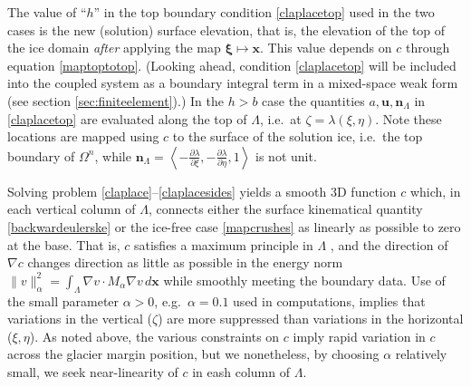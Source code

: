 \documentclass[letterpaper,final,12pt,reqno]{amsart}
\newcommand{\grad}{\nabla}
\newcommand{\bn}{\mathbf{n}}
\newcommand{\bu}{\mathbf{u}}
\newcommand{\bx}{\mathbf{x}}
\newcommand{\bxi}{\bm{\xi}}
\begin{document}
The value of ``$h$'' in the top boundary condition \eqref{claplacetop} used in the two cases is the new (solution) surface elevation, that is, the elevation of the top of the ice domain \emph{after} applying the map $\bxi\mapsto \bx$.  This value depends on $c$ through equation \eqref{maptoptotop}.  (Looking ahead, condition \eqref{claplacetop} will be included into the coupled system as a boundary integral term in a mixed-space weak form (see section \ref{sec:finiteelement}).)  In the $h>b$ case the quantities $a,\bu,\bn_\Lambda$ in \eqref{claplacetop} are evaluated along the top of $\Lambda$, i.e.~at $\zeta=\lambda(\xi,\eta)$.  Note these locations are mapped using $c$ to the surface of the solution ice, i.e.~the top boundary of $\Omega^n$, while $\bn_\Lambda = \left<-\frac{\partial\lambda}{\partial\xi},-\frac{\partial\lambda}{\partial\eta},1\right>$ is not unit.

Solving problem \eqref{claplace}--\eqref{claplacesides} yields a smooth 3D function $c$ which, in each vertical column of $\Lambda$, connects either the surface kinematical quantity \eqref{backwardeulerske} or the ice-free case \eqref{mapcrushes} as linearly as possible to zero at the base.  That is, $c$ satisfies a maximum principle in $\Lambda$ \cite{Evans2010}, and the direction of $\grad c$ changes direction as little as possible in the energy norm $\|v\|_\alpha^2 = \int_\Lambda \grad v \cdot M_\alpha \grad v\,d\bx$ while smoothly meeting the boundary data.  Use of the small parameter $\alpha>0$, e.g.~$\alpha=0.1$ used in computations, implies that variations in the vertical ($\zeta$) are more suppressed than variations in the horizontal ($\xi,\eta$).  As noted above, the various constraints on $c$ imply rapid variation in $c$ across the glacier margin position, but we nonetheless, by choosing $\alpha$ relatively small, we seek near-linearity of $c$ in eash column of $\Lambda$.
\end{document}
